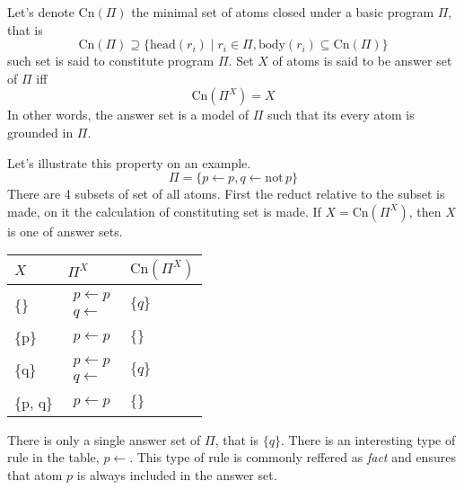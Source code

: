 \documentclass{fithesis}
\newcommand{\asprule}[2]{#1 \leftarrow #2}
\newcommand{\aspnot}{\mathrm{not}\,}
\newcommand{\asphead}{\mathrm{head}}
\newcommand{\aspbody}{\mathrm{body}}
\begin{document}
Let's denote $\mathrm{Cn}(\Pi)$ the minimal set of atoms closed under
a basic program $\Pi$, that is
\begin{equation}
    \mathrm{Cn}(\Pi) \supseteq
    \{\asphead(r_i) \mid r_i\in \Pi, \aspbody(r_i) \subseteq \mathrm{Cn}(\Pi)\}
\end{equation}
such set is said to constitute program $\Pi$.
Set $X$ of atoms is said to be answer set of $\Pi$ iff
\begin{equation}
    \mathrm{Cn}(\Pi^X) = X
\end{equation}
In other words, the answer set is a model of $\Pi$ such that its every atom
is grounded in $\Pi$.

Let's illustrate this property on an example.
\begin{equation*}
    \Pi = \{\asprule{p}{p}, \asprule{q}{\aspnot p}\}
\end{equation*}
There are 4 subsets of set of all atoms. First the reduct relative to
the subset is made, on it the calculation of constituting set is made.
If $X = \mathrm{Cn}(\Pi^X)$, then $X$ is one of answer sets.
\begin{center}
    \begin{tabular}{l|l|l}
        $X$ & $\Pi^X$ & $\mathrm{Cn}(\Pi^X)$ \\\hline
        \{\} & $\begin{matrix}\asprule{p}{p}\\\asprule{q}{}\end{matrix}$ & $\{q\}$\\\hline
        \{p\} & $\begin{matrix}\asprule{p}{p}\end{matrix}$ & $\{\}$\\\hline
        \{q\} & $\begin{matrix}\asprule{p}{p}\\\asprule{q}{}\end{matrix}$ & $\{q\}$\\\hline
        \{p, q\} & $\begin{matrix}\asprule{p}{p}\end{matrix}$ & $\{\}$
    \end{tabular}
\end{center}
There is only a single answer set of $\Pi$, that is $\{q\}$. There is
an interesting type of rule in the table, $\asprule{p}{}$. This type of rule
is commonly reffered as \textit{fact} and ensures that atom $p$ is always
included in the answer set.
\end{document}
